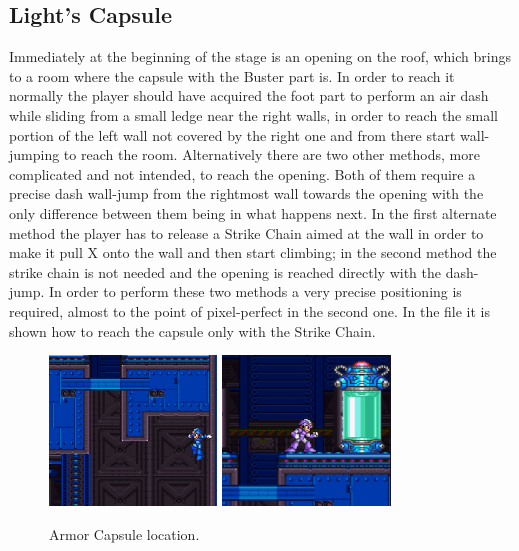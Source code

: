 \subsection{Light's Capsule}\label{X2:Arm_parts}
Immediately at the beginning of the stage is an opening on the roof, which brings to a room where the capsule with the Buster part is. In order to reach it normally the player should have acquired the foot part to perform an air dash while sliding from a small ledge near the right walls, in order to reach the small portion of the left wall not covered by the right one and from there start wall-jumping to reach the room. Alternatively there are two other methods, more complicated and not intended, to reach the opening. Both of them require a precise dash wall-jump from the rightmost wall towards the opening with the only difference between them being in what happens next. In the first alternate method the player has to release a Strike Chain aimed at the wall in order to make it pull X onto the wall and then start climbing; in the second method the strike chain is not needed and the opening is reached directly with the dash-jump. In order to perform these two methods a very precise positioning is required, almost to the point of pixel-perfect in the second one. In the file  it is shown how to reach the capsule only with the Strike Chain.
\begin{figure}[htp]
	\centering
	\includegraphics[height=4cm]{figures/X2/Wheel_gator/Gator_capsule_1.jpg}
	\includegraphics[height=4cm]{figures/X2/Wheel_gator/Gator_capsule.jpg}
	\caption{Armor Capsule location.}
\end{figure}

